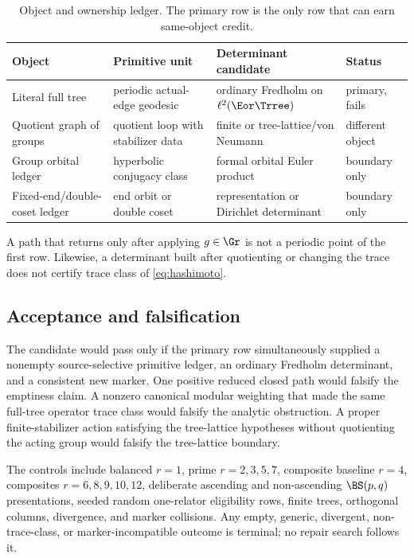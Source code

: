 \begin{table}[H]
\centering
\small
\caption{Object and ownership ledger.  The primary row is the only row that
can earn same-object credit.}
\label{tab:object-ledger}
\begin{tabularx}{\textwidth}{L{3.3cm}YYL{2.4cm}}
\toprule
Object & Primitive unit & Determinant candidate & Status \\
\midrule
Literal full tree & periodic actual-edge geodesic & ordinary Fredholm on
$\ell^2(\Eor\Trree)$ & primary, fails \\
Quotient graph of groups & quotient loop with stabilizer data & finite or
tree-lattice/von Neumann & different object \\
Group orbital ledger & hyperbolic conjugacy class & formal orbital Euler
product & boundary only \\
Fixed-end/double-coset ledger & end orbit or double coset & representation or
Dirichlet determinant & boundary only \\
\bottomrule
\end{tabularx}
\end{table}

A path that returns only after applying $g\in\Gr$ is not a periodic point of
the first row.  Likewise, a determinant built after quotienting or changing
the trace does not certify trace class of \eqref{eq:hashimoto}.

\subsection{Acceptance and falsification}

The candidate would pass only if the primary row simultaneously supplied a
nonempty source-selective primitive ledger, an ordinary Fredholm determinant,
and a consistent new marker.  One positive reduced closed path would falsify
the emptiness claim.  A nonzero canonical modular weighting that made the
same full-tree operator trace class would falsify the analytic obstruction.
A proper finite-stabilizer action satisfying the tree-lattice hypotheses
without quotienting the acting group would falsify the tree-lattice boundary.

The controls include balanced $r=1$, prime $r=2,3,5,7$, composite baseline
$r=4$, composites $r=6,8,9,10,12$, deliberate ascending and non-ascending
$\BS(p,q)$ presentations, seeded random one-relator eligibility rows, finite
trees, orthogonal columns, divergence, and marker collisions.  Any empty,
generic, divergent, non-trace-class, or marker-incompatible outcome is
terminal; no repair search follows it.
